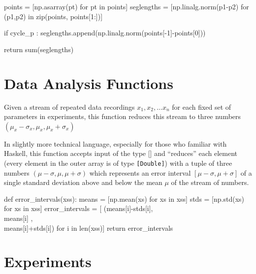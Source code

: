      points     = [np.asarray(pt) for pt in points]
     seglengths = [np.linalg.norm(p1-p2) for (p1,p2) in zip(points, points[1:])]

     if cycle_p :
          seglengths.append(np.linalg.norm(points[-1]-points[0]))

     return sum(seglengths)
\nwendcode{}    



\section{Data Analysis Functions}
Given a stream of repeated data recordings $x_1, x_2, \ldots x_n$ for each fixed set of parameters
in experiments, this function reduces this stream to three numbers $(\mu_x-\sigma_x, \mu_x, \mu_x+\sigma_x)$

In slightly more technical language, especially for those who familiar with Haskell, 
this function accepts input of the type [\!] and ``reduces'' each 
element (every element in the outer array is of type \texttt{[Double]})
with a tuple of three numbers $(\mu-\sigma, \mu, \mu+\sigma)$ which represents an 
error interval $[\mu-\sigma, \mu + \sigma]$ of a single standard deviation above and
below the mean $\mu$ of the stream of numbers. 

\nwenddocs{}\plusendmoddef\nwstartdeflinemarkup{}\nwenddeflinemarkup
def error_intervals(xss):
     means           = [np.mean(xs) for xs in xss]
     stds            = [np.std(xs)  for xs in xss]
     error_intervals =  [ (means[i]-stds[i], \\
                           means[i]        , \\
                           means[i]+stds[i])   for i in len(xss)]
     return error_intervals
\nwendcode{}\nwdocspar









\section{Experiments}

